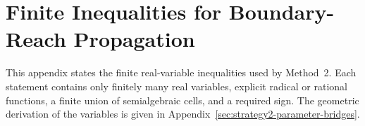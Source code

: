 \section{Finite Inequalities for Boundary-Reach Propagation}
\label{sec:strategy2-optimization-problems}

This appendix states the finite real-variable inequalities used by Method~2.
Each statement contains only finitely many real variables, explicit radical or
rational functions, a finite union of semialgebraic cells, and a required sign.
The geometric derivation of the variables is given in
Appendix~\ref{sec:strategy2-parameter-bridges}.







